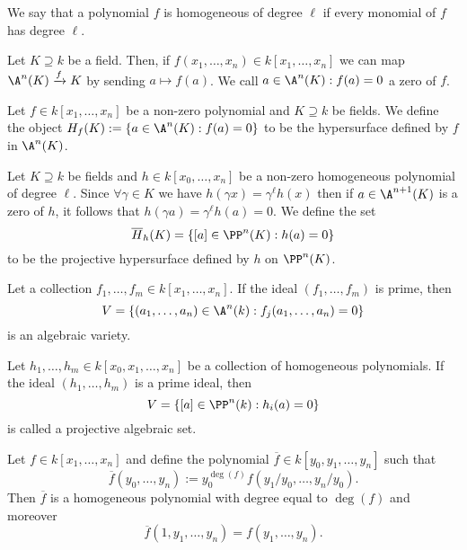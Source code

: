 \begin{definition}
    We say that a polynomial \(f\) is homogeneous of degree \(\ell\) if every
    monomial of \(f\) has degree \(\ell\).
\end{definition}

Let \(K \supseteq k\) be a field. Then, if \(f(x_1, \dots, x_n) \in k[x_1, \dots,
        x_n]\) we can map \(\A^n(K) \xrightarrow{f} K\) by sending \(a \mapsto f(a)\).
We call \(a \in \A^n(K) : f(a) = 0\) a zero of \(f\).

\begin{definition}[Hypersurface]
    Let \(f \in k[x_1, \dots, x_n]\) be a non-zero polynomial and \(K \supseteq
    k\) be fields. We define the object \(H_f(K) := \{a \in \A^n(K) : f(a) = 0\}
    \) to be the hypersurface defined by \(f\) in \(\A^n(K)\).
\end{definition}

\begin{definition}
    Let \(K \supseteq k\) be fields and \(h \in k[x_0, \dots, x_n]\) be a non-zero
    homogeneous polynomial of degree \(\ell\). Since \(\forall \gamma \in K\) we
    have \(h(\gamma x) = \gamma^\ell h(x)\) then if \(a \in \A^{n+1}(K)\) is a
    zero of \(h\), it follows that \(h(\gamma a) = \gamma^\ell h(a) = 0\). We
    define the set
    \[
        \overline{H}_h(K) = \{[a] \in \PP^n(K) : h(a) = 0\}
    \]
    to be the projective hypersurface defined by \(h\) on \(\PP^n(K)\).
\end{definition}

\begin{definition}
    Let a collection \(f_1, \dots, f_m \in k[x_1, \dots, x_n]\). If the ideal
    \((f_1, \dots, f_m)\) is prime, then
    \[
        V = \{(a_1, \dots, a_n) \in \A^n(k) :f_j(a_1, \dots, a_n) = 0\}
    \]
    is an algebraic variety.
\end{definition}

\begin{definition}
    Let \(h_1, \dots, h_m \in k[x_0, x_1, \dots, x_n]\) be a collection of
    homogeneous polynomials. If the ideal \((h_1,\dots,h_m)\) is a prime ideal,
    then
    \[
        V = \{[a] \in \PP^{n}(k) : h_i(a) = 0\}
    \]
    is called a projective algebraic set.
\end{definition}

\begin{proposition}[Homogenization]
    Let \(f \in k[x_1, \dots, x_n]\) and define the polynomial \(\overline{f} \in
    k[y_0, y_1,\dots,y_n]\) such that
    \[
        \overline{f}(y_0, \dots, y_n) := y_0^{\deg(f)} f\left( y_1/y_0, \dots,
        y_n/y_0 \right).
    \]
    Then \(\overline{f}\) is a homogeneous polynomial with degree equal to
    \(\deg(f)\) and moreover \[\overline{f}(1, y_1, \dots, y_n) = f(y_1, \dots,
        y_n).\]
\end{proposition}

